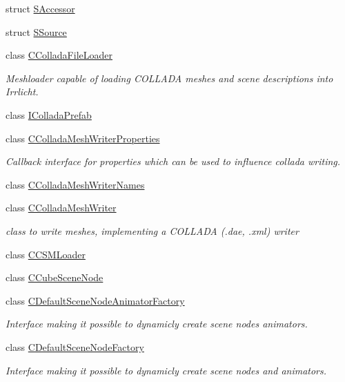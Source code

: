 \begin{DoxyCompactItemize}
\item 
struct \hyperlink{structirr_1_1scene_1_1_s_accessor}{S\-Accessor}
\item 
struct \hyperlink{structirr_1_1scene_1_1_s_source}{S\-Source}
\item 
class \hyperlink{classirr_1_1scene_1_1_c_collada_file_loader}{C\-Collada\-File\-Loader}
\begin{DoxyCompactList}\small\item\em Meshloader capable of loading C\-O\-L\-L\-A\-D\-A meshes and scene descriptions into Irrlicht. \end{DoxyCompactList}\item 
class \hyperlink{classirr_1_1scene_1_1_i_collada_prefab}{I\-Collada\-Prefab}
\item 
class \hyperlink{classirr_1_1scene_1_1_c_collada_mesh_writer_properties}{C\-Collada\-Mesh\-Writer\-Properties}
\begin{DoxyCompactList}\small\item\em Callback interface for properties which can be used to influence collada writing. \end{DoxyCompactList}\item 
class \hyperlink{classirr_1_1scene_1_1_c_collada_mesh_writer_names}{C\-Collada\-Mesh\-Writer\-Names}
\item 
class \hyperlink{classirr_1_1scene_1_1_c_collada_mesh_writer}{C\-Collada\-Mesh\-Writer}
\begin{DoxyCompactList}\small\item\em class to write meshes, implementing a C\-O\-L\-L\-A\-D\-A (.dae, .xml) writer \end{DoxyCompactList}\item 
class \hyperlink{classirr_1_1scene_1_1_c_c_s_m_loader}{C\-C\-S\-M\-Loader}
\item 
class \hyperlink{classirr_1_1scene_1_1_c_cube_scene_node}{C\-Cube\-Scene\-Node}
\item 
class \hyperlink{classirr_1_1scene_1_1_c_default_scene_node_animator_factory}{C\-Default\-Scene\-Node\-Animator\-Factory}
\begin{DoxyCompactList}\small\item\em Interface making it possible to dynamicly create scene nodes animators. \end{DoxyCompactList}\item 
class \hyperlink{classirr_1_1scene_1_1_c_default_scene_node_factory}{C\-Default\-Scene\-Node\-Factory}
\begin{DoxyCompactList}\small\item\em Interface making it possible to dynamicly create scene nodes and animators. \end{DoxyCompactList}\item 

\end{DoxyCompactItemize}
